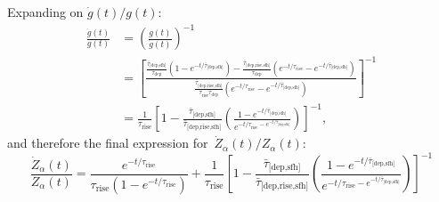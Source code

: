 \documentclass[12pt]{article}
\newcommand{\ddfrac}[2]{\frac{\displaystyle{#1}}{\displaystyle{#2}}}
\newcommand{\timescale}[1]{\ensuremath{\tau_\text{#1}}}
\newcommand{\harmonic}[2]{\ensuremath{\bar{\tau}_\text{[#1,#2]}}}
\newcommand{\hharmonic}[3]{\ensuremath{\bar{\tau}_\text{[#1,#2,#3]}}}
\begin{document}
Expanding on $\dot{g}(t) / g(t)$:
\begin{subequations}\begin{align}
\frac{\dot{g}(t)}{g(t)} &= \left(\frac{g(t)}{\dot{g}(t)}\right)^{-1}
\\
&= \left[\ddfrac{
	\frac{
		\harmonic{dep}{sfh}
	}{
		\timescale{dep}
	} \left(1 - e^{-t / \harmonic{dep}{sfh}}\right) -
	\frac{
		\hharmonic{dep}{rise}{sfh}
	}{
		\timescale{dep}
	} \left(e^{-t / \timescale{rise}} -
	e^{-t / \harmonic{dep}{sfh}}\right)
}{
	\frac{
		\hharmonic{dep}{rise}{sfh}
	}{
		\timescale{rise}\timescale{dep}
	}
	\left(e^{-t / \timescale{rise}} - e^{-t / \harmonic{dep}{sfh}}
	\right)
}\right]^{-1}
\\
&= \frac{1}{\timescale{rise}}\left[1 -
\frac{
	\harmonic{dep}{sfh}
}{
	\hharmonic{dep}{rise}{sfh}
}\left(
\frac{
	1 - e^{-t / \harmonic{dep}{sfh}}
}{
	e^{-t / \timescale{rise} - e^{-t / \harmonic{dep}{sfh}}}
}
\right)
\right]^{-1},
\end{align}\end{subequations}
and therefore the final expression for~$\dot{Z}_\alpha(t) / Z_\alpha(t)$:
\begin{equation}
\frac{\dot{Z}_\alpha(t)}{Z_\alpha(t)} = \frac{
	e^{-t / \timescale{rise}}
}{
	\timescale{rise} (1 - e^{-t / \timescale{rise}})
} + \frac{1}{\timescale{rise}} \left[
1 - \frac{
	\harmonic{dep}{sfh}
}{
	\hharmonic{dep}{rise}{sfh}
}\left(\frac{
	1 - e^{-t / \harmonic{dep}{sfh}}
}{
	e^{-t / \timescale{rise} - e^{-t / \harmonic{dep}{sfh}}}
}\right)
\right]^{-1}
\end{equation}
\end{document}
